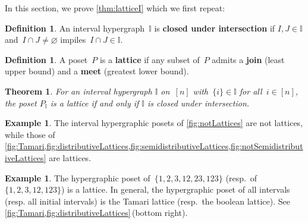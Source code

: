\documentclass[reqno]{amsart}
\newtheorem{theoremA}{Theorem}
\theoremstyle{definition}
\newtheorem{definition}[theorem]{Definition}
\newtheorem{example}[theorem]{Example}
\newcommand{\defn}[1]{\textbf{\textsf{\color{PineGreen} #1}}} %
\newcommand{\II}{\mathbb I} %
\begin{document}
In this section, we prove \cref{thm:latticeI} which we first repeat: %

\begin{definition}
\label{def:intersectionClosed}
An interval hypergraph~$\II$ is \defn{closed under intersection} if $I, J \in \II$ and~$I \cap J \ne \varnothing$ impiles~$I \cap J \in \II$.
\end{definition}

\begin{definition}
A poset~$P$ is a \defn{lattice} if any subset of~$P$ admits a \defn{join} (least upper bound) and a \defn{meet} (greatest lower bound).
\end{definition}

\begin{theoremA}
For an interval hypergraph $\II$ on~$[n]$ with~$\{i\} \in \II$ for all~$i \in [n]$, the poset $P_\II$ is a lattice if and only if $\II$ is closed under intersection.
\end{theoremA}

\begin{example}
The interval hypergraphic posets of \cref{fig:notLattices} are not lattices, while those of \cref{fig:Tamari,fig:distributiveLattices,fig:semidistributiveLattices,fig:notSemidistributiveLattices} are lattices.
\end{example}

\begin{example}
The hypergraphic poset of~$\{ 1, 2, 3, 12, 23, 123\}$ (resp.~of~$\{ 1, 2, 3, 12, 123\}$) is a lattice.
In general, the hypergraphic poset of all intervals (resp. all initial intervals) is the Tamari lattice (resp.~the boolean lattice).
See \cref{fig:Tamari,fig:distributiveLattices}\,(bottom right).
\end{example}
\end{document}
